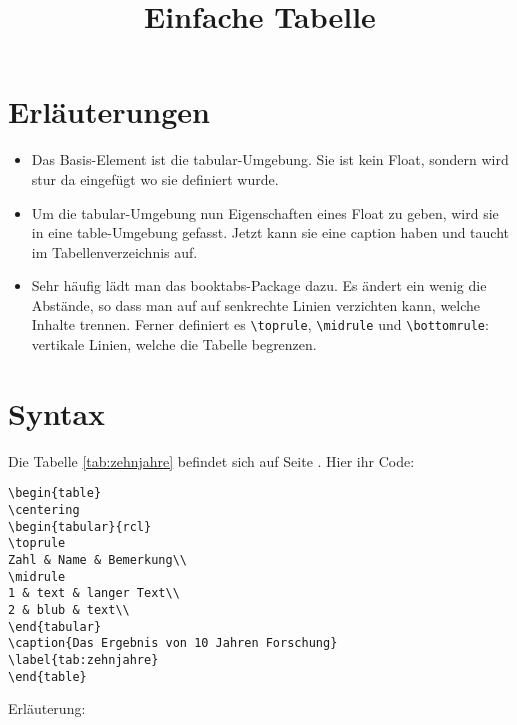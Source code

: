 \documentclass{scrartcl}
\title{Einfache Tabelle}
\begin{document}
\listoftables



\section{Erläuterungen}

\begin{itemize}
	\item Das Basis-Element ist die tabular-Umgebung. Sie ist kein Float, sondern wird stur da eingefügt wo sie definiert wurde. 
	\item Um die tabular-Umgebung nun Eigenschaften eines Float zu geben, wird sie in eine table-Umgebung gefasst. Jetzt kann sie eine caption haben und taucht im Tabellenverzeichnis auf.
	\item Sehr häufig lädt man das booktabs-Package dazu. Es ändert ein wenig die Abstände, so dass man auf auf senkrechte Linien verzichten kann, welche Inhalte trennen. Ferner definiert es \verb|\toprule|, \verb|\midrule| und \verb|\bottomrule|: vertikale Linien, welche die Tabelle begrenzen.
\end{itemize}

\enlargethispage{3cm}


\section{Syntax}

Die Tabelle \ref{tab:zehnjahre} befindet sich auf Seite \pageref{tab:zehnjahre}. Hier ihr Code:

\begin{verbatim}
\begin{table}
\centering
\begin{tabular}{rcl}
\toprule
Zahl & Name & Bemerkung\\
\midrule
1 & text & langer Text\\
2 & blub & text\\
\end{tabular}
\caption{Das Ergebnis von 10 Jahren Forschung}
\label{tab:zehnjahre}
\end{table}
\end{verbatim}

\noindent Erläuterung:
\end{document}
